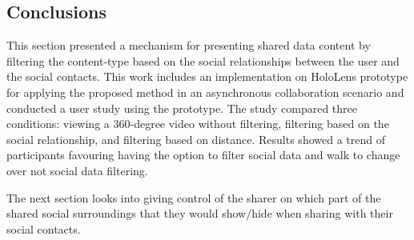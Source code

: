
\subsection{Conclusions}

This section presented a mechanism for presenting shared data content by filtering the content-type based on the social relationships between the user and the social contacts. This work includes an implementation on HoloLens prototype for applying the proposed method in an asynchronous collaboration scenario and conducted a user study using the prototype. The study compared three conditions: viewing a 360-degree video without filtering, filtering based on the social relationship, and filtering based on distance. Results showed a trend of participants favouring having the option to filter social data and walk to change over not social data filtering. 

The next section looks into giving control of the sharer on which part of the shared social surroundings that they would show/hide when sharing with their social contacts. 